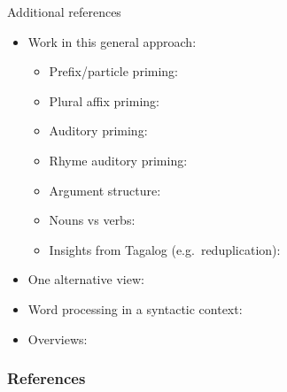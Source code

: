 \begin{frame}{Additional references}
	\begin{itemize}
		\item Work in this general approach:
			\begin{itemize}
			\item Prefix/particle priming: \cite{creemersetal20jml}
			\item Plural affix priming: \cite{goodwindaviesembick19}
			\item Auditory priming: \cite{schluter13,ussishkinetal15}
			\item Rhyme auditory priming: \cite{bacovcinetal17}
			\item Argument structure: \cite{gwilliamsmarantz18,neophytouetal18}
			\item Nouns vs verbs: \cite{kingetal14}
            \item Insights from Tagalog (e.g.~reduplication): \cite{cayadoetal23}
			\end{itemize}
		\item One alternative view: \cite{baayenetal11,baayenetal15lcn,marantz13lcp}
		\item Word processing in a syntactic context: \cite{lukechristianson11}
		\item Overviews: \cite{crepaldi23taf,stockallgwilliams20cup}
	\end{itemize}
\end{frame}




\appendix
\begin{frame}
	\frametitle{References}
	\tiny
	
	
\end{frame}





\begin{columns}[t]
	\begin{column}{0.5\textwidth}
	\end{column}
	\begin{column}{0.5\textwidth}		
	\end{column}
\end{columns}